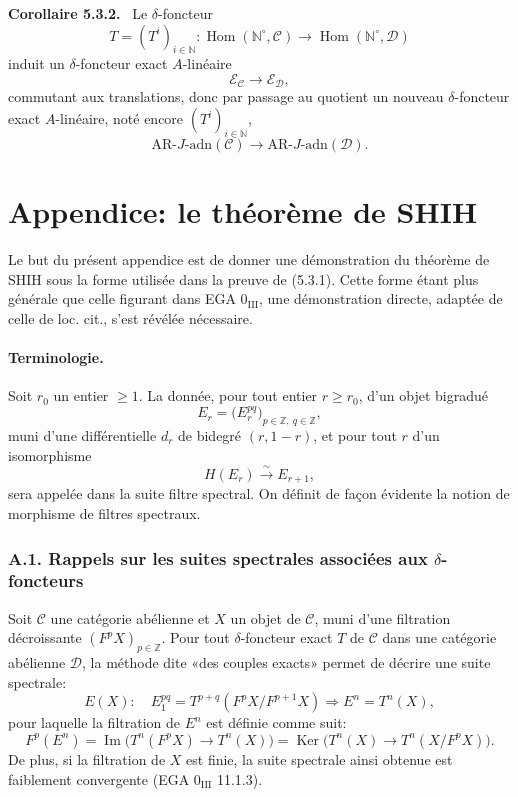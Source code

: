 \documentclass[11pt]{article}
\newenvironment{statement}[1]{\par\medskip\noindent\textbf{#1.}\ }{\par\medskip}
\DeclareMathOperator{\Hom}{Hom}
\providecommand{\Ker}{\operatorname{Ker}}
\providecommand{\Hom}{\operatorname{Hom}}
\providecommand{\Im}{\operatorname{Im}}
\providecommand{\Ker}{\operatorname{Ker}}
\renewcommand{\Im}{\operatorname{Im}}
\providecommand{\Ker}{\operatorname{Ker}}
\providecommand{\Im}{\operatorname{Im}}
\begin{document}
\begin{statement}{Corollaire 5.3.2}
Le \(\delta\)-foncteur
\[
T=(T^i)_{i\in\mathbb N}:\Hom(\mathbb N^\circ,\mathcal C)\longrightarrow\Hom(\mathbb N^\circ,\mathcal D)
\]
induit un \(\delta\)-foncteur exact \(A\)-linéaire
\[
\mathcal E_{\mathcal C}\longrightarrow\mathcal E_{\mathcal D},
\]
commutant aux translations, donc par passage au quotient un nouveau \(\delta\)-foncteur exact \(A\)-linéaire, noté encore \((T^i)_{i\in\mathbb N}\),
\[
\mathrm{AR}\text{-}J\text{-adn}(\mathcal C)\longrightarrow
\mathrm{AR}\text{-}J\text{-adn}(\mathcal D).
\]
\end{statement}

\section*{Appendice: le théorème de SHIH}

Le but du présent appendice est de donner une démonstration du théorème de SHIH sous la forme utilisée dans la preuve de (5.3.1). Cette forme étant plus générale que celle figurant dans EGA \(0_{\mathrm{III}}\), une démonstration directe, adaptée de celle de loc. cit., s'est révélée nécessaire.

\paragraph{Terminologie.}
Soit \(r_0\) un entier \(\ge1\). La donnée, pour tout entier \(r\ge r_0\), d'un objet bigradué
\[
E_r=\bigl(E_r^{pq}\bigr)_{p\in\mathbb Z,\ q\in\mathbb Z},
\]
muni d'une différentielle \(d_r\) de bidegré \((r,1-r)\), et pour tout \(r\) d'un isomorphisme
\[
H(E_r)\xrightarrow{\sim}E_{r+1},
\]
sera appelée dans la suite filtre spectral. On définit de façon évidente la notion de morphisme de filtres spectraux.

\subsubsection*{A.1. Rappels sur les suites spectrales associées aux \(\delta\)-foncteurs}

Soit \(\mathcal C\) une catégorie abélienne et \(X\) un objet de \(\mathcal C\), muni d'une filtration décroissante \((F^pX)_{p\in\mathbb Z}\). Pour tout \(\delta\)-foncteur exact \(T\) de \(\mathcal C\) dans une catégorie abélienne \(\mathcal D\), la méthode dite «des couples exacts» permet de décrire une suite spectrale:
\[
E(X):\quad E_1^{pq}=T^{p+q}(F^pX/F^{p+1}X)\Rightarrow E^n=T^n(X),
\]
pour laquelle la filtration de \(E^n\) est définie comme suit:
\[
F^p(E^n)=\Im\bigl(T^n(F^pX)\longrightarrow T^n(X)\bigr)
=\Ker\bigl(T^n(X)\longrightarrow T^n(X/F^pX)\bigr).
\]
De plus, si la filtration de \(X\) est finie, la suite spectrale ainsi obtenue est faiblement convergente (EGA \(0_{\mathrm{III}}\) 11.1.3).
\end{document}
